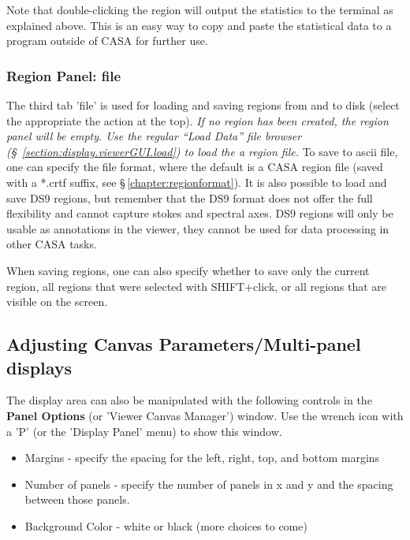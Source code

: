Note that double-clicking the region will output the 
statistics to the terminal as explained above. This is an easy way to
copy and paste the statistical data to a program outside of CASA for
further use. 


\subsubsection{Region Panel: file}
\label{section:display.image.rgnmgr.file}

The third tab 'file' is used for loading and saving regions from and
to disk (select the appropriate the action at the top). {\it If no
  region has been created, the region panel will be empty. Use the
  regular ``Load Data'' file browser
  (\S~\ref{section:display.viewerGUI.load}) to load the a region file.}
To save to ascii file, one can specify the file format, where the
default is a CASA region file (saved with a *.crtf suffix, see
\S\,\ref{chapter:regionformat}). It is also possible to load and save
DS9 regions, but remember that the DS9 format does not offer the full
flexibility and cannot capture stokes and spectral axes. DS9 regions
will only be usable as annotations in the viewer, they cannot be used
for data processing in other CASA tasks.

When saving regions, one can also specify whether to save only the
current region, all regions that were selected with
SHIFT+click, or all regions that are visible on the screen. 


\subsection{Adjusting Canvas Parameters/Multi-panel displays}
\label{section:display.viewerGUI.canvas}

The display area can also be manipulated with the following controls in
the {\bf Panel Options} (or 'Viewer Canvas Manager') window.
Use the wrench icon with a 'P' (or the 'Display Panel' menu) to show this
window.
\begin{itemize}
   \item Margins - specify the spacing for the left, right, top, and bottom margins
   \item Number of panels - specify the number of panels in x and y
         and the spacing between those panels.
   \item Background Color - white or black (more choices to come)
\end{itemize}

